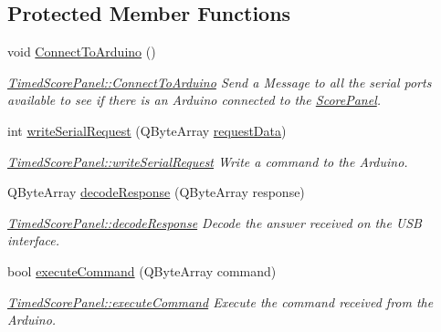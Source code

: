 \subsection*{Protected Member Functions}
\begin{DoxyCompactItemize}
\item 
\mbox{\label{classTimedScorePanel_a971b104a47767e9f5a2632ce6bbf9eb2}} 
void \mbox{\hyperlink{classTimedScorePanel_a971b104a47767e9f5a2632ce6bbf9eb2}{Connect\+To\+Arduino}} ()
\begin{DoxyCompactList}\small\item\em \mbox{\hyperlink{classTimedScorePanel_a971b104a47767e9f5a2632ce6bbf9eb2}{Timed\+Score\+Panel\+::\+Connect\+To\+Arduino}} Send a Message to all the serial ports available to see if there is an Arduino connected to the \mbox{\hyperlink{classScorePanel}{Score\+Panel}}. \end{DoxyCompactList}\item 
int \mbox{\hyperlink{classTimedScorePanel_a4e817b212121e6970b2af49c8e7c47ca}{write\+Serial\+Request}} (Q\+Byte\+Array \mbox{\hyperlink{classTimedScorePanel_ab709153aa0a1ea23d2209c359b3adfe0}{request\+Data}})
\begin{DoxyCompactList}\small\item\em \mbox{\hyperlink{classTimedScorePanel_a4e817b212121e6970b2af49c8e7c47ca}{Timed\+Score\+Panel\+::write\+Serial\+Request}} Write a command to the Arduino. \end{DoxyCompactList}\item 
Q\+Byte\+Array \mbox{\hyperlink{classTimedScorePanel_aa4af54da0ec58b24e4e36812c90de9b8}{decode\+Response}} (Q\+Byte\+Array response)
\begin{DoxyCompactList}\small\item\em \mbox{\hyperlink{classTimedScorePanel_aa4af54da0ec58b24e4e36812c90de9b8}{Timed\+Score\+Panel\+::decode\+Response}} Decode the answer received on the U\+SB interface. \end{DoxyCompactList}\item 
bool \mbox{\hyperlink{classTimedScorePanel_a0b1e7a7596b1e059571c65ce6046c343}{execute\+Command}} (Q\+Byte\+Array command)
\begin{DoxyCompactList}\small\item\em \mbox{\hyperlink{classTimedScorePanel_a0b1e7a7596b1e059571c65ce6046c343}{Timed\+Score\+Panel\+::execute\+Command}} Execute the command received from the Arduino. \end{DoxyCompactList}\end{DoxyCompactItemize}

